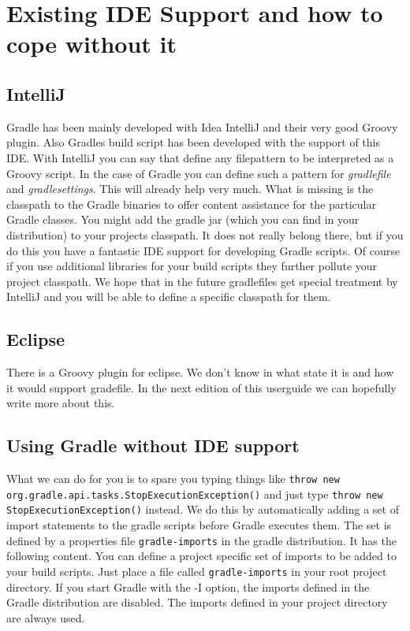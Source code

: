 \chapter{Existing IDE Support and how to cope without it} %
\label{cha:ide_support}
\section{IntelliJ} %
\label{sec:intellij}
Gradle has been mainly developed with Idea IntelliJ and their very good Groovy plugin. Also Gradles build script has been developed with the support of this IDE. With IntelliJ you can say that define any filepattern to be interpreted as a Groovy script. In the case of Gradle you can define such a pattern for \emph{gradlefile} and \emph{gradlesettings}. This will already help very much. What is missing is the classpath to the Gradle binaries to offer content assistance for the particular Gradle classes. You might add the gradle jar (which you can find in your distribution) to your projects classpath. It does not really belong there, but if you do this you have a fantastic IDE support for developing Gradle scripts. Of course if you use additional libraries for your build scripts they further pollute your project classpath.  
We hope that in the future gradlefiles get special treatment by IntelliJ and you will be able to define a specific classpath for them. 

\section{Eclipse} %
\label{sec:eclipse}
There is a Groovy plugin for eclipse. We don't know in what state it is and how it would support gradefile. In the next edition of this userguide we can hopefully write more about this.

\section{Using Gradle without IDE support} %
\label{sec:using_gradle_without_ide_support}
What we can do for you is to spare you typing things like \texttt{throw new org.gradle.api.tasks.StopExecutionException()} and just type \texttt{throw new StopExecutionException()} instead. We do this by automatically adding a set of import statements to the gradle scripts before Gradle executes them. The set is defined by a properties file \texttt{gradle-imports} in the gradle distribution. It has the following content.
You can define a project specific set of imports to be added to your build scripts. Just place a file called \texttt{gradle-imports} in your root project directory. If you start Gradle with the {-I} option, the imports defined in the Gradle distribution are disabled. The imports defined in your project directory are always used.

